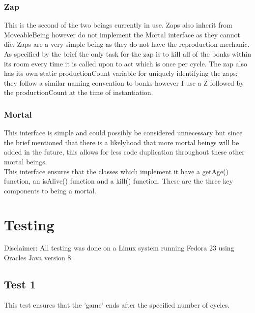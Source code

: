 \documentclass[12pt]{article}
\begin{document}
\subsubsection{Zap}
This is the second of the two beings currently in use. Zaps also inherit from MoveableBeing however do not implement the Mortal interface as they cannot die. Zaps are a very simple being as they do not have the reproduction mechanic. As specified by the brief the only task for the zap is to kill all of the bonks within its room every time it is called upon to act which is once per cycle. The zap also has its own static productionCount variable for uniquely identifying the zaps; they follow a similar naming convention to bonks however I use a Z followed by the productionCount at the time of instantiation.
\subsubsection{Mortal}
This interface is simple and could possibly be considered unnecessary but since the brief mentioned that there is a likelyhood that more mortal beings will be added in the future, this allows for less code duplication throughout these other mortal beings.\\

This interface ensures that the classes which implement it have a getAge() function, an isAlive() function and a kill() function. These are the three key components to being a mortal.
\section{Testing}
Disclaimer: All testing was done on a Linux system running Fedora 23 using Oracles Java version 8.

\subsection{Test 1}
This test ensures that the 'game' ends after the specified number of cycles.
\end{document}
